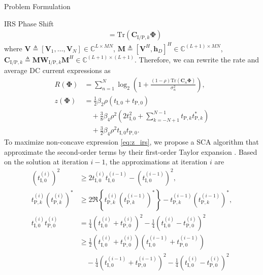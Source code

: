 \documentclass[journal]{IEEEtran}
\begin{document}
\begin{section}{Problem Formulation}
\begin{subsection}{IRS Phase Shift}
\begin{align}
				& = \mathrm{Tr}(\boldsymbol{C}_{\mathrm{I/P},k}\boldsymbol{\Phi})
			\end{align}
			where $\boldsymbol{V} \triangleq [\boldsymbol{V}_1,\dots,\boldsymbol{V}_N] \in \mathbb{C}^{L \times MN}$, $\boldsymbol{M} \triangleq [\boldsymbol{V}^H, \boldsymbol{h}_{D}]^H \in \mathbb{C}^{(L+1) \times MN}$, $\boldsymbol{C}_{\mathrm{I/P},k} \triangleq \boldsymbol{M}\boldsymbol{W}_{\mathrm{I/P},k}\boldsymbol{M}^H \in \mathbb{C}^{(L+1)\times(L+1)}$. Therefore, we can rewrite the rate and average DC current expressions as
			\begin{align}
				R(\boldsymbol{\Phi})
				& = \sum_{n=1}^{N}{\log_2\left(1+\frac{(1-\rho)\mathrm{Tr}(\boldsymbol{C}_n\boldsymbol{\Phi})}{\sigma_n^2}\right)},\label{eq:R_irs}\\
				z(\boldsymbol{\Phi})
				& = \frac{1}{2}{\beta_2}{\rho}(t_{\mathrm{I},0}+t_{\mathrm{P},0})\nonumber\\
				& \quad + \frac{3}{8}{\beta_4}{\rho^2} \left(2t_{\mathrm{I},0}^2 + \sum_{k=-N+1}^{N-1}{t_{\mathrm{P},k}t_{\mathrm{P},k}^*}\right)\nonumber\\
				& \quad + \frac{3}{2}{\beta_4}{\rho^2}t_{\mathrm{I},0}t_{\mathrm{P},0}.\label{eq:z_irs}
			\end{align}
			To maximize non-concave expression \eqref{eq:z_irs}, we propose a SCA algorithm that approximate the second-order terms by their first-order Taylor expansion \cite{Adali2010}. Based on the solution at iteration $i - 1$, the approximations at iteration $i$ are
			\begin{align}
				(t_{\mathrm{I},0}^{(i)})^2
				& \ge 2 t_{\mathrm{I},0}^{(i)}t_{\mathrm{I},0}^{(i-1)} - (t_{\mathrm{I},0}^{(i-1)})^2,\label{eq:taylor_1}\\
				t_{\mathrm{P},k}^{(i)} (t_{\mathrm{P},k}^{(i)})^*
				& \ge 2 \Re\left\{t_{\mathrm{P},k}^{(i)} (t_{\mathrm{P},k}^{(i-1)})^*\right\} - t_{\mathrm{P},k}^{(i-1)} (t_{\mathrm{P},k}^{(i-1)})^*,\label{eq:taylor_2}\\
				t_{\mathrm{I},0}^{(i)} t_{\mathrm{P},0}^{(i)}
				& = \frac{1}{4}(t_{\mathrm{I},0}^{(i)} + t_{\mathrm{P},0}^{(i)})^2 - \frac{1}{4}(t_{\mathrm{I},0}^{(i)} - t_{\mathrm{P},0}^{(i)})^2\nonumber\\
				& \ge \frac{1}{2}(t_{\mathrm{I},0}^{(i)} + t_{\mathrm{P},0}^{(i)})(t_{\mathrm{I},0}^{(i-1)} + t_{\mathrm{P},0}^{(i-1)})\nonumber\\
				& \quad - \frac{1}{4}(t_{\mathrm{I},0}^{(i-1)} + t_{\mathrm{P},0}^{(i-1)})^2 - \frac{1}{4}(t_{\mathrm{I},0}^{(i)} - t_{\mathrm{P},0}^{(i)})^2\label{eq:taylor_3}

\end{align}
\end{subsection}
\end{section}
\end{document}
